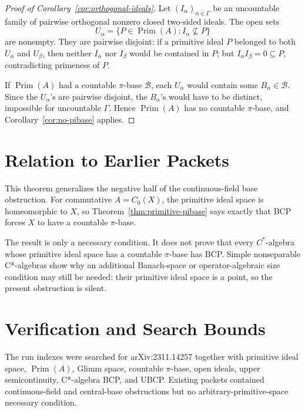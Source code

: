 \documentclass[11pt]{article}
\newcommand{\Prim}{\operatorname{Prim}}
\begin{document}
\begin{proof}[Proof of Corollary~\ref{cor:orthogonal-ideals}]
Let \((I_\alpha)_{\alpha\in\Gamma}\) be an uncountable family of pairwise
orthogonal nonzero closed two-sided ideals.  The open sets
\[
        U_\alpha=\{P\in\Prim(A):I_\alpha\not\subseteq P\}
\]
are nonempty.  They are pairwise disjoint: if a primitive ideal \(P\) belonged
to both \(U_\alpha\) and \(U_\beta\), then neither \(I_\alpha\) nor
\(I_\beta\) would be contained in \(P\); but \(I_\alpha I_\beta=0\subseteq P\),
contradicting primeness of \(P\).

If \(\Prim(A)\) had a countable \(\pi\)-base \(\mathcal B\), each
\(U_\alpha\) would contain some \(B_\alpha\in\mathcal B\).  Since the
\(U_\alpha\)'s are pairwise disjoint, the \(B_\alpha\)'s would have to be
distinct, impossible for uncountable \(\Gamma\).  Hence \(\Prim(A)\) has no
countable \(\pi\)-base, and Corollary~\ref{cor:no-pibase} applies.
\end{proof}

\section*{Relation to Earlier Packets}

This theorem generalizes the negative half of the continuous-field base
obstruction.  For commutative \(A=C_0(X)\), the primitive ideal space is
homeomorphic to \(X\), so Theorem~\ref{thm:primitive-pibase} says exactly that
BCP forces \(X\) to have a countable \(\pi\)-base.

The result is only a necessary condition.  It does not prove that every
\(C^*\)-algebra whose primitive ideal space has a countable \(\pi\)-base has
BCP.  Simple nonseparable C*-algebras show why an additional Banach-space or
operator-algebraic size condition may still be needed: their primitive ideal
space is a point, so the present obstruction is silent.

\section*{Verification and Search Bounds}

The run indexes were searched for arXiv:2311.14257 together with primitive
ideal space, \(\Prim(A)\), Glimm space, countable \(\pi\)-base, open ideals,
upper semicontinuity, C*-algebra BCP, and UBCP.  Existing packets contained
continuous-field and central-base obstructions but no arbitrary-primitive-space
necessary condition.
\end{document}
